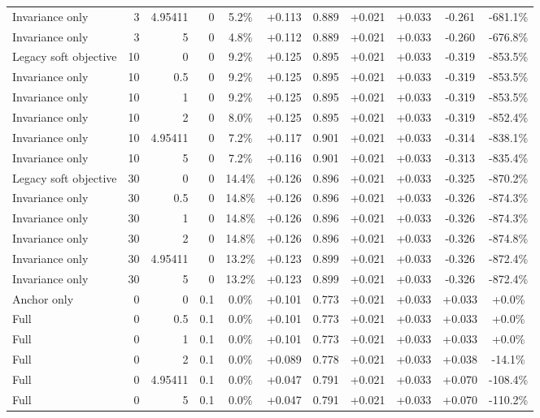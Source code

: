 \begin{table}[htbp]
\begin{tabular}{lrrrccccccc}
Invariance only & 3 & 4.95411 & 0 & 5.2\% & +0.113 & 0.889 & +0.021 & +0.033 & -0.261 & -681.1\% \\
Invariance only & 3 & 5 & 0 & 4.8\% & +0.112 & 0.889 & +0.021 & +0.033 & -0.260 & -676.8\% \\
Legacy soft objective & 10 & 0 & 0 & 9.2\% & +0.125 & 0.895 & +0.021 & +0.033 & -0.319 & -853.5\% \\
Invariance only & 10 & 0.5 & 0 & 9.2\% & +0.125 & 0.895 & +0.021 & +0.033 & -0.319 & -853.5\% \\
Invariance only & 10 & 1 & 0 & 9.2\% & +0.125 & 0.895 & +0.021 & +0.033 & -0.319 & -853.5\% \\
Invariance only & 10 & 2 & 0 & 8.0\% & +0.125 & 0.895 & +0.021 & +0.033 & -0.319 & -852.4\% \\
Invariance only & 10 & 4.95411 & 0 & 7.2\% & +0.117 & 0.901 & +0.021 & +0.033 & -0.314 & -838.1\% \\
Invariance only & 10 & 5 & 0 & 7.2\% & +0.116 & 0.901 & +0.021 & +0.033 & -0.313 & -835.4\% \\
Legacy soft objective & 30 & 0 & 0 & 14.4\% & +0.126 & 0.896 & +0.021 & +0.033 & -0.325 & -870.2\% \\
Invariance only & 30 & 0.5 & 0 & 14.8\% & +0.126 & 0.896 & +0.021 & +0.033 & -0.326 & -874.3\% \\
Invariance only & 30 & 1 & 0 & 14.8\% & +0.126 & 0.896 & +0.021 & +0.033 & -0.326 & -874.3\% \\
Invariance only & 30 & 2 & 0 & 14.8\% & +0.126 & 0.896 & +0.021 & +0.033 & -0.326 & -874.8\% \\
Invariance only & 30 & 4.95411 & 0 & 13.2\% & +0.123 & 0.899 & +0.021 & +0.033 & -0.326 & -872.4\% \\
Invariance only & 30 & 5 & 0 & 13.2\% & +0.123 & 0.899 & +0.021 & +0.033 & -0.326 & -872.4\% \\
Anchor only & 0 & 0 & 0.1 & 0.0\% & +0.101 & 0.773 & +0.021 & +0.033 & +0.033 & +0.0\% \\
Full & 0 & 0.5 & 0.1 & 0.0\% & +0.101 & 0.773 & +0.021 & +0.033 & +0.033 & +0.0\% \\
Full & 0 & 1 & 0.1 & 0.0\% & +0.101 & 0.773 & +0.021 & +0.033 & +0.033 & +0.0\% \\
Full & 0 & 2 & 0.1 & 0.0\% & +0.089 & 0.778 & +0.021 & +0.033 & +0.038 & -14.1\% \\
Full & 0 & 4.95411 & 0.1 & 0.0\% & +0.047 & 0.791 & +0.021 & +0.033 & +0.070 & -108.4\% \\
Full & 0 & 5 & 0.1 & 0.0\% & +0.047 & 0.791 & +0.021 & +0.033 & +0.070 & -110.2\% \\

\end{tabular}
\end{table}
